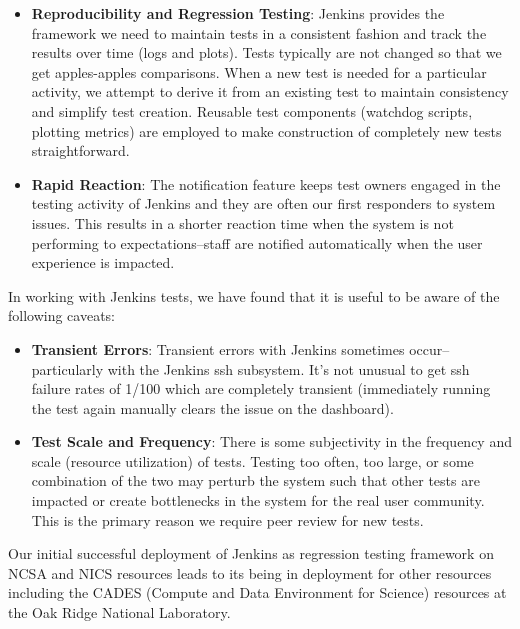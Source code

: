 \documentclass[10pt, conference, compsocconf]{IEEEtran}
\begin{document}
\begin{itemize}
 
\item \textbf{Reproducibility and Regression Testing}: Jenkins provides the framework we need to maintain tests in a consistent fashion and track the results over time (logs and plots). 
Tests typically are not changed so that we get apples-apples comparisons.
When a new test is needed for a particular activity, we attempt to derive it from an existing test to maintain consistency and simplify test creation.
Reusable test components (watchdog scripts, plotting metrics) are employed to make construction of completely new tests straightforward.

\item \textbf{Rapid Reaction}:
The notification feature keeps test owners engaged in the testing activity of Jenkins and they are often our first responders to system issues.  This results in a shorter reaction time when the system is not performing to expectations--staff are notified automatically when the user experience is impacted.

\end{itemize}

In working with Jenkins tests, we have found that it is useful to be aware of the following caveats: 

\begin{itemize}

\item \textbf{Transient Errors}: Transient errors with Jenkins sometimes occur--particularly with the Jenkins ssh subsystem. 
It's not unusual to get ssh failure rates of 1/100 which are completely transient (immediately running the test again manually clears the issue on the dashboard).

\item \textbf{Test Scale and Frequency}: There is some subjectivity in the frequency and scale (resource utilization) of tests.
Testing too often, too large, or some combination of the two may perturb the system such that other tests are impacted or create bottlenecks in the system for the real user community.
This is the primary reason we require peer review for new tests.
\end{itemize}

Our initial successful deployment of Jenkins as regression testing framework on NCSA and NICS resources leads to its being in deployment for other resources including the CADES (Compute and Data Environment for Science) resources at the Oak Ridge National Laboratory. 
\end{document}
